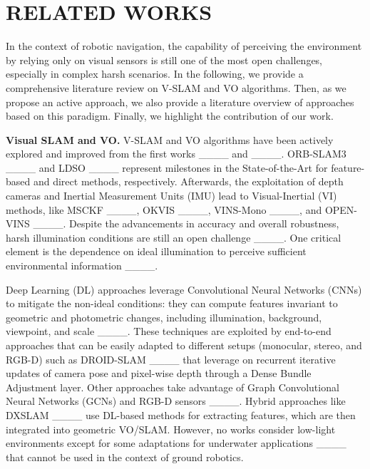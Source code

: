 \section{RELATED WORKS}
\label{sec:related_works}
In the context of robotic navigation, the capability of perceiving the environment by relying only on visual sensors is still one of the most open challenges, especially in complex harsh scenarios.
In the following, we provide a comprehensive literature review on V-SLAM and VO algorithms.
Then, as we propose an active approach, we also provide a literature overview of approaches based on this paradigm. 
Finally, we highlight the contribution of our work.



\textbf{Visual SLAM and VO.} 
V-SLAM and VO algorithms have been actively explored and improved from the first works ____ and ____. ORB-SLAM3 ____ and LDSO ____ represent milestones in the State-of-the-Art for feature-based and direct methods, respectively. Afterwards, the exploitation of depth cameras and Inertial Measurement Units (IMU) lead to Visual-Inertial (VI) methods, like MSCKF ____, OKVIS ____, VINS-Mono ____, and OPEN-VINS ____. 
Despite the advancements in accuracy and overall robustness, harsh illumination conditions are still an open challenge ____. One critical element is the dependence on ideal illumination to perceive sufficient environmental information ____. 

Deep Learning (DL) approaches leverage Convolutional Neural Networks (CNNs) to mitigate the non-ideal conditions: they can compute features invariant to geometric and photometric changes, including illumination, background, viewpoint, and scale ____. These techniques are exploited by end-to-end approaches that can be easily adapted
to different setups (monocular, stereo, and RGB-D) such as DROID-SLAM ____ that leverage on recurrent iterative updates of camera pose and pixel-wise depth through a Dense Bundle Adjustment layer. Other approaches take advantage of Graph Convolutional Neural Networks (GCNs)  and RGB-D sensors ____. Hybrid approaches like DXSLAM ____ use DL-based methods for extracting features, which are then integrated into geometric VO/SLAM. 
However, no works consider low-light environments except for some adaptations for underwater applications ____ that cannot be used in the context of ground robotics.


